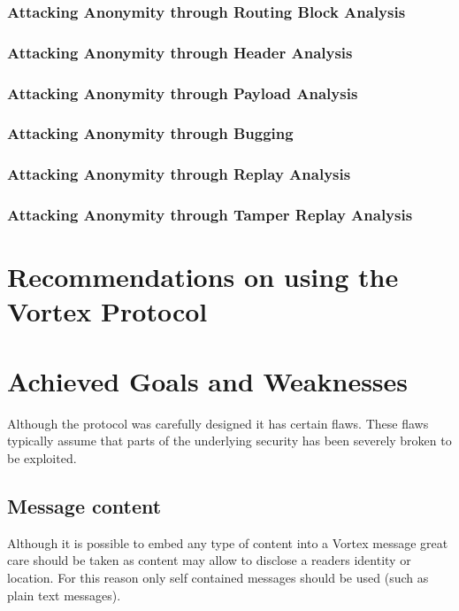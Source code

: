 \subsection{Attacking Anonymity through Routing Block Analysis}

\subsection{Attacking Anonymity through Header Analysis}

\subsection{Attacking Anonymity through Payload Analysis}

\subsection{Attacking Anonymity through Bugging}

\subsection{Attacking Anonymity through Replay Analysis}

\subsection{Attacking Anonymity through Tamper Replay Analysis}

\chapter{Recommendations on using the Vortex Protocol}

\chapter{Achieved Goals and Weaknesses}
Although the protocol was carefully designed it has certain flaws. These flaws typically assume that parts of the underlying security has been severely broken to be exploited.


\section{Message content}
Although it is possible to embed any type of content into a Vortex message great care should be taken as content may allow to disclose a readers identity or location. For this reason only self contained messages should be used (such as plain text messages).

